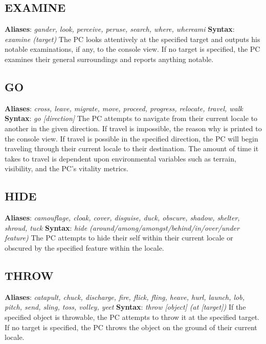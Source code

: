 \documentclass[11pt]{article}
\begin{document}
	\subsection{EXAMINE}
	\textbf{Aliases}: \textit{gander, look, perceive, peruse, search, where, whereami}\newline
	\textbf{Syntax}: \textit{examine (target)}\newline
	The PC looks attentively at the specified target and outputs his notable examinations, if any, to the console view. If no target is specified, the PC examines their general surroundings and reports anything notable.
	\subsection{GO}
	\textbf{Aliases}: \textit{cross, leave, migrate, move, proceed, progress, relocate, travel, walk}\newline
	\textbf{Syntax}: \textit{go [direction]}\newline
	The PC attempts to navigate from their current locale to another in the given direction. If travel is impossible, the reason why is printed to the console view. If travel is possible in the specified direction, the PC will begin traveling through their current locale to their destination. The amount of time it takes to travel is dependent upon environmental variables such as terrain, visibility, and the PC's vitality metrics.
	\subsection{HIDE}
	\textbf{Aliases}: \textit{camouflage, cloak, cover, disguise, duck, obscure, shadow, shelter, shroud,  tuck}\newline
	\textbf{Syntax}: \textit{hide (around/among/amongst/behind/in/over/under feature)}\newline
	The PC attempts to hide their self within their current locale or obscured by the specified feature within the locale.
	\subsection{THROW}
	\textbf{Aliases}: \textit{catapult, chuck, discharge, fire, flick, fling, heave, hurl, launch, lob, pitch, send, sling, toss, volley, yeet}\newline
	\textbf{Syntax}: \textit{throw [object] (at [target])}\newline
	If the specified object is throwable, the PC attempts to throw it at the specified target. If no target is specified, the PC throws the object on the ground of their current locale.
\end{document}
